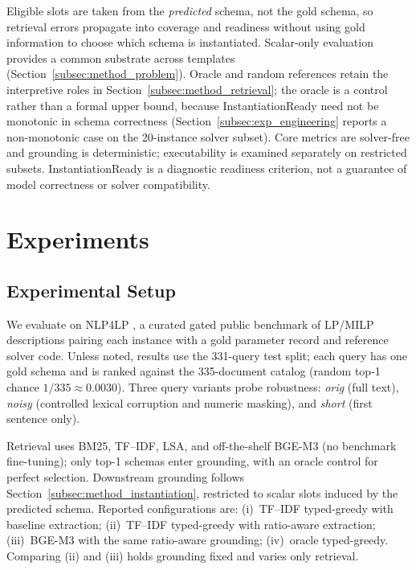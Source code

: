 \documentclass[pdflatex,sn-basic,Numbered]{sn-jnl}
\begin{document}
Eligible slots are taken from the \emph{predicted} schema, not the gold schema, so retrieval errors propagate into coverage and readiness without using gold information to choose which schema is instantiated. Scalar-only evaluation provides a common substrate across templates (Section~\ref{subsec:method_problem}). Oracle and random references retain the interpretive roles in Section~\ref{subsec:method_retrieval}; the oracle is a control rather than a formal upper bound, because InstantiationReady need not be monotonic in schema correctness (Section~\ref{subsec:exp_engineering} reports a non-monotonic case on the 20-instance solver subset). Core metrics are solver-free and grounding is deterministic; executability is examined separately on restricted subsets. InstantiationReady is a diagnostic readiness criterion, not a guarantee of model correctness or solver compatibility.

\section{Experiments}
\label{sec:experiments}

\subsection{Experimental Setup}
\label{subsec:exp_setup}

We evaluate on \textsc{NLP4LP} \cite{nlp4lp_dataset,ahmaditeshnizi2024optimus_icml}, a curated gated public benchmark of LP/MILP descriptions pairing each instance with a gold parameter record and reference solver code. Unless noted, results use the 331-query test split; each query has one gold schema and is ranked against the 335-document catalog (random top-1 chance $1/335 \approx 0.0030$). Three query variants probe robustness: \emph{orig} (full text), \emph{noisy} (controlled lexical corruption and numeric masking), and \emph{short} (first sentence only).

Retrieval uses BM25, TF--IDF, LSA, and off-the-shelf BGE-M3 (no benchmark fine-tuning); only top-1 schemas enter grounding, with an oracle control for perfect selection. Downstream grounding follows Section~\ref{subsec:method_instantiation}, restricted to scalar slots induced by the predicted schema. Reported configurations are: (i)~TF--IDF typed-greedy with baseline extraction; (ii)~TF--IDF typed-greedy with ratio-aware extraction; (iii)~BGE-M3 with the same ratio-aware grounding; (iv)~oracle typed-greedy. Comparing (ii) and (iii) holds grounding fixed and varies only retrieval.
\end{document}
